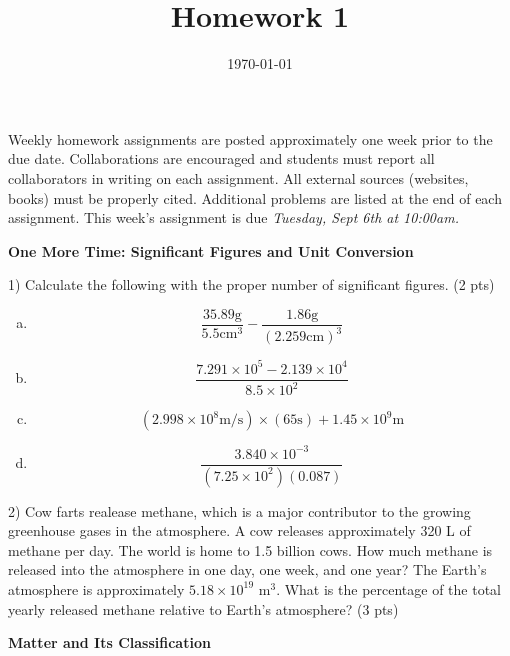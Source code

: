\documentclass[12pt]{article}
\title{\textbf{Homework 1}}
\date{\vspace{-2em}\today}
\begin{document}
\maketitle 

Weekly homework assignments are posted approximately one week prior to the
due date. Collaborations are encouraged and students must report all collaborators
in writing on each assignment. All external sources (websites, books) must be
properly cited. Additional problems are listed at the end of each assignment.
This week's assignment is due \textit{Tuesday, Sept 6th at 10:00am.}

\textbf{One More Time: Significant Figures and Unit Conversion}

1) Calculate the following with the proper number of significant figures. (2 pts)

\begin{enumerate}[a)]
\item \begin{equation*}
  \frac{35.89 \text{g}}{5.5 \text{cm}^3} - \frac{1.86 \text{g}}{(2.259 \text{cm})^3}
\end{equation*}
\item \begin{equation*}
  \frac{7.291\times 10^5 - 2.139 \times 10^4}{8.5 \times 10^2}
\end{equation*}
\item \begin{equation*}
  (2.998 \times 10^8 \text{m/s})\times(65\text{s}) + 1.45\times 10^9 \text{m}
\end{equation*}
\item \begin{equation*}
  \frac{3.840\times 10^{-3}}{(7.25\times 10^2)(0.087)}
\end{equation*}
\end{enumerate}

2) Cow farts realease methane, which is a major contributor to the growing greenhouse
gases in the atmosphere. A cow releases approximately 320 L of methane per day.
The world is home to 1.5 billion cows. How much methane is released into the
atmosphere in one day, one week, and one year? The Earth's atmosphere is approximately
$5.18\times 10^{19}$ m$^3$. What is the percentage of the total yearly released methane
relative to Earth's atmosphere? (3 pts)

\vspace{2in}

\textbf{Matter and Its Classification}
\end{document}
